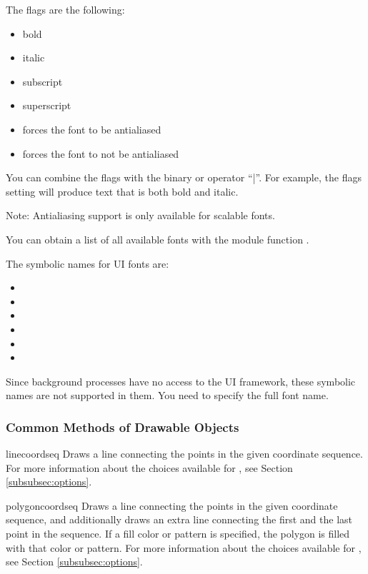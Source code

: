 The flags are the following:
\begin{itemize}
\item {} bold
\item {} italic
\item {} subscript
\item {} superscript
\item {} forces the font to be antialiased
\item {} forces the font to not be antialiased
\end{itemize}

You can combine the flags with the binary or operator ``|''. For
example, the flags setting  will produce
text that is both bold and italic.

Note: Antialiasing support is only available for scalable fonts.

You can obtain a list of all available fonts with the 
 module function .

The symbolic names for UI fonts are:
\begin{itemize}
\item {}
\item {}
\item {}
\item {}
\item {}
\item {}
\end{itemize}
Since background processes have no access to the UI framework, these 
symbolic names are not supported in them. You need to specify the full font 
name.

\subsubsection{Common Methods of Drawable Objects}
\label{subsubsec:common}
\begin{methoddesc}{line}{coordseq}
Draws a line connecting the points in the given coordinate sequence. For 
more information about the choices available for , 
see Section \ref{subsubsec:options}.
\end{methoddesc}

\begin{methoddesc}{polygon}{coordseq}
Draws a line connecting the points in the given coordinate sequence, and 
additionally draws an extra line connecting the first and the last point in 
the sequence. If a fill color or pattern is specified, the polygon is filled 
with that color or pattern. For more information about the choices available 
for , see Section \ref{subsubsec:options}.
\end{methoddesc}

